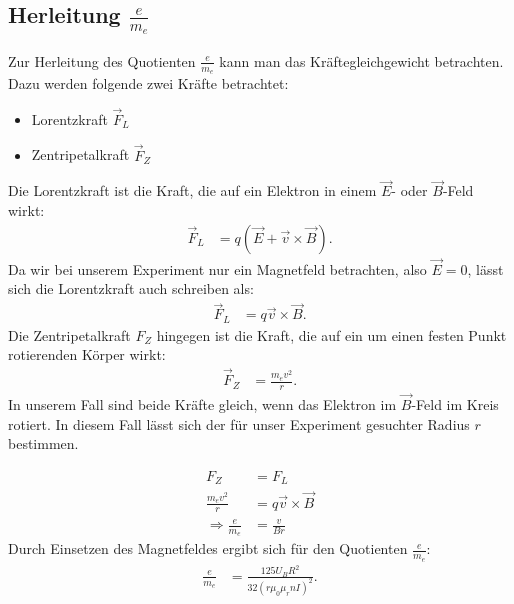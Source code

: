 \subsection{Herleitung $\frac{e}{m_e}$}
Zur Herleitung des Quotienten $\frac{e}{m_e}$ kann man das Kräftegleichgewicht betrachten. Dazu werden folgende zwei Kräfte betrachtet:
\begin{itemize}
\item Lorentzkraft $\vec{F}_L$
\item Zentripetalkraft $\vec{F}_Z$
\end{itemize}
Die Lorentzkraft ist die Kraft, die auf ein Elektron in einem $\vec{E}$- oder $\vec{B}$-Feld wirkt:
\begin{align*}
\vec{F}_L&=q\left(\vec{E}+\vec{v}\times\vec{B}\right)\text{.}
\end{align*}
Da wir bei unserem Experiment nur ein Magnetfeld betrachten, also $\vec{E}=0$, lässt sich die Lorentzkraft auch schreiben als:
\begin{align}
\vec{F}_L&=q\vec{v}\times\vec{B}.
\end{align}
Die Zentripetalkraft $F_Z$ hingegen ist die Kraft, die auf ein um einen festen Punkt rotierenden Körper wirkt:
\begin{align}
\vec{F}_Z&=\frac{m_ev^2}{r}\text{.}
\end{align}
In unserem Fall sind beide Kräfte gleich, wenn das Elektron im $\vec{B}$-Feld im Kreis rotiert. In diesem Fall lässt sich der für
unser Experiment gesuchter Radius $r$ bestimmen.

\begin{align}
F_Z&=F_L \\
\frac{m_ev^2}{r}&=q\vec{v} \times \vec{B} \\
\Rightarrow \frac{e}{m_e}&=\frac{v}{Br}
\end{align}
Durch Einsetzen des Magnetfeldes ergibt sich für den Quotienten $\frac{e}{m_e}$:
\begin{align}
\frac{e}{m_e}&=\frac{125U_BR^2}{32\left(r\mu_0\mu_rnI\right)^2}\text{.}
\end{align}